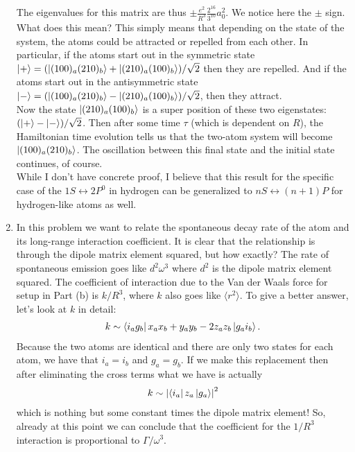 \documentclass{article}
\theoremstyle{definition}
\newcommand{\f}[2]{\frac{#1}{#2}}
\begin{document}
\begin{enumerate}[label=(\alph*)]
The eigenvalues for this matrix are thus $\pm \f{e^2}{R^3} \f{2^{16}}{3^{10}} a_0^2 $. We notice here the $\pm$ sign. What does this mean? This simply means that depending on the state of the system, the atoms could be attracted or repelled from each other. In particular, if the atoms start out in the symmetric state $\ket{+}  = (\ket{(100)_a (210)_b} + \ket{(210)_a (100)_b})/\sqrt{2}$ then they are repelled. And if the atoms start out in the antisymmetric state $\ket{-} = (\ket{(100)_a (210)_b} - \ket{(210)_a (100)_b})/\sqrt{2}$, then they attract. \\

Now the state $\ket{(210)_a (100)_b}$ is a super position of these two eigenstates: $(\ket{+} - \ket{-})/\sqrt{2}$. Then after some time $\tau$ (which is dependent on $R$), the Hamiltonian time evolution tells us that the two-atom system will become $\ket{(100)_a (210)_b}$. The oscillation between this final state and the initial state continues, of course. \\

While I don't have concrete proof, I believe that this result for the specific case of the $1S \leftrightarrow 2P^0$ in hydrogen can be generalized to $nS \leftrightarrow (n+1)P$ for hydrogen-like atoms as well.




\item In this problem we want to relate the spontaneous decay rate of the atom and its long-range interaction coefficient. It is clear that the relationship is through the dipole matrix element squared, but how exactly? The rate of spontaneous emission goes like $d^2 \omega^3$ where $d^2$ is the dipole matrix element squared. The coefficient of interaction due to the Van der Waals force for setup in Part (b) is $k / R^3$, where $k$ also goes like $\langle r^2 \rangle$. To give a better answer, let's look at $k$ in detail:
\begin{align*}
k \sim \bra{i_a g_b}   x_a x_b + y_a y_b - 2z_a z_b \ket{g_a i_b}.
\end{align*}
Because the two atoms are identical and there are only two states for each atom, we have that $i_a = i_b$ and $g_a = g_b$. If we make this replacement then after eliminating the cross terms what we have is actually 
\begin{align*}
k \sim \abs{ \bra{i_a}  z_a \ket{g_a } }^2
\end{align*}
which is nothing but some constant times the dipole matrix element! So, already at this point we can conclude that the coefficient for the $1/R^3$ interaction is proportional to $\Gamma / \omega^3$. \\


\end{enumerate}
\end{document}

